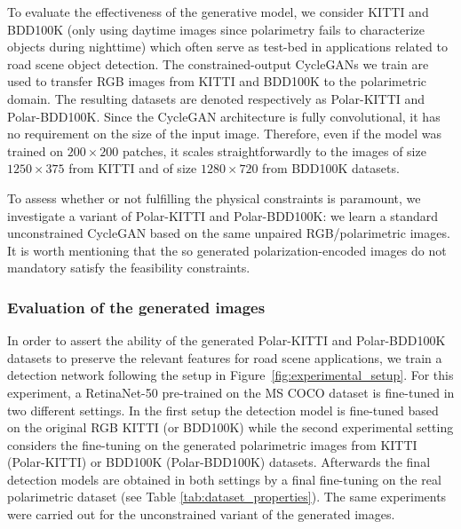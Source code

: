 To evaluate the effectiveness of the generative model, we consider KITTI \citep{Geiger2012} and BDD100K \citep{Yu2020}(only using daytime images since polarimetry fails to characterize objects during nighttime) which often serve as test-bed in applications related to road scene object detection. The constrained-output CycleGANs we train are used to transfer RGB images from KITTI and BDD100K to the polarimetric domain. The resulting datasets are denoted respectively as Polar-KITTI and Polar-BDD100K. Since the CycleGAN architecture is fully convolutional, it has no requirement on the size of the input image. Therefore, even if the model was trained on $200 \times 200$ patches, it scales straightforwardly to the images of size $1250 \times 375$ from KITTI and of size $1280 \times 720$ from BDD100K datasets.

To assess whether or not fulfilling the physical  constraints is paramount, we investigate a variant of Polar-KITTI and Polar-BDD100K: we learn a standard unconstrained CycleGAN based on the same unpaired RGB/polarimetric images. It is worth mentioning that the so generated polarization-encoded images do not mandatory satisfy the feasibility constraints. 

\subsubsection{Evaluation of the generated images} \label{subsec:eval_gen_img}

In order to assert the ability of the generated Polar-KITTI and Polar-BDD100K datasets to preserve the relevant features for road scene applications, we train a detection network following the setup in Figure~\ref{fig:experimental_setup}. For this experiment, a RetinaNet-50 \citep{Lin2017} pre-trained on the MS COCO dataset \citep{Lin2014} is fine-tuned in two different settings. In the first setup the detection model is fine-tuned based on the original RGB KITTI (or BDD100K) while the second experimental setting considers the fine-tuning on the generated polarimetric images from KITTI (Polar-KITTI) or BDD100K (Polar-BDD100K) datasets. Afterwards the final detection models are obtained in both settings by a final fine-tuning on the real polarimetric dataset (see Table \ref{tab:dataset_properties}). The same experiments were carried out for the unconstrained variant of the generated images.

